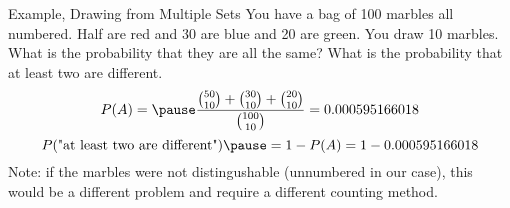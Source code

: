 \documentclass[handout]{beamer}
\newcommand{\nl}[1]{\vspace{#1 em}}
\begin{document}
\begin{frame}{Example, Drawing from Multiple Sets}
    You have a bag of 100 marbles all numbered. Half are red and 30 are blue and 20 are green. You draw 10 marbles. What is the probability that they are all the same? What is the probability that at least two are different.\\
    \nl{0.5}
    \pause 
    \[P(A) = \pause \frac{\binom{50}{10} + \binom{30}{10} + \binom{20}{10}}{\binom{100}{10}} = 0.000595166018\]
    \pause \[P(\text{"at least two are different"}) \pause = 1 - P(A) = 1-0.000595166018\]
    \pause
    Note: if the marbles were not distingushable (unnumbered in our case), this would be a different problem and require a different counting method.
\end{frame}
\end{document}
